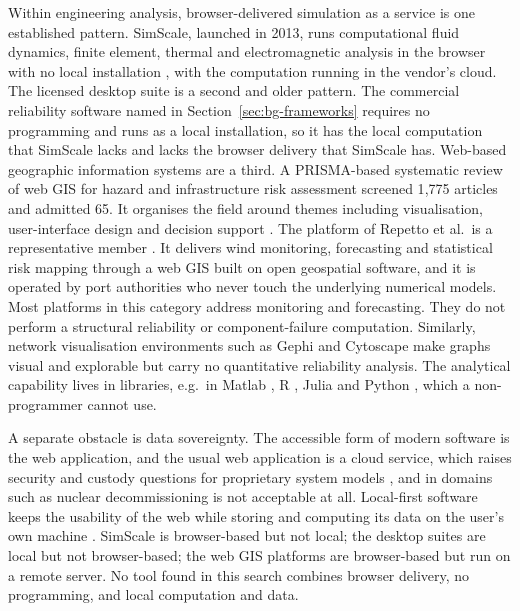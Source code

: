 \documentclass[12pt]{report}
\begin{document}
Within engineering analysis, browser-delivered simulation as a service is one established
pattern. SimScale, launched in 2013, runs computational fluid dynamics, finite element, thermal
and electromagnetic analysis in the browser with no local installation \cite{simscale}, with the
computation running in the vendor's cloud. The licensed desktop suite is a second and older pattern. The commercial reliability
software named in Section~\ref{sec:bg-frameworks} requires no programming and runs as a
local installation, so it has the local computation that SimScale lacks and lacks the
browser delivery that SimScale has. Web-based
geographic information systems are a third. A PRISMA-based systematic review of web GIS for hazard and infrastructure risk assessment
screened 1{,}775 articles and admitted 65. It organises the field around themes including
visualisation, user-interface design and decision support \cite{daud2024webgis}. The platform of
Repetto et al.\ is a representative member \cite{repetto2018windgis}. It delivers wind
monitoring, forecasting and statistical risk mapping through a web GIS built on open
geospatial software, and it is operated by port authorities who never touch the underlying
numerical models.
Most platforms in this category address monitoring and forecasting. They do not perform a
structural reliability or component-failure computation. Similarly, network visualisation environments
such as Gephi \cite{bastian2009gephi} and Cytoscape \cite{shannon2003cytoscape} make graphs
visual and explorable but carry no quantitative reliability analysis. The analytical capability
lives in libraries, e.g.\ in Matlab \cite{opencossan2018}, R \cite{ferson2019pbar}, Julia
\cite{gray2021pbajulia} and Python \cite{gray2022pba}, which a non-programmer cannot use.

A separate obstacle is data sovereignty. The accessible form of modern software is the
web application, and the usual web application is a cloud service, which raises security and
custody questions for proprietary system models \cite{hashizume2013analysis}, and in domains
such as nuclear decommissioning is not acceptable at all. Local-first software keeps the
usability of the web while storing and computing its data on the user's own machine
\cite{kleppmann2019local}. SimScale is browser-based but not local; the desktop suites are
local but not browser-based; the web GIS platforms are browser-based but run on a remote
server. No tool found in this search combines browser delivery, no programming, and local
computation and data.
\end{document}
